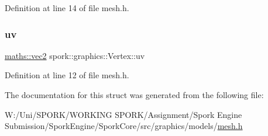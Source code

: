 Definition at line 14 of file mesh.\+h.

\mbox{\label{structspork_1_1graphics_1_1_vertex_a6819c06c407580090fbef90a86241d30}} 
\subsubsection{\texorpdfstring{uv}{uv}}
{\footnotesize\ttfamily \hyperlink{structspork_1_1maths_1_1vec2}{maths\+::vec2} spork\+::graphics\+::\+Vertex\+::uv}



Definition at line 12 of file mesh.\+h.



The documentation for this struct was generated from the following file\+:\begin{DoxyCompactItemize}
\item 
W\+:/\+Uni/\+S\+P\+O\+R\+K/\+W\+O\+R\+K\+I\+N\+G S\+P\+O\+R\+K/\+Assignment/\+Spork Engine Submission/\+Spork\+Engine/\+Spork\+Core/src/graphics/models/\hyperlink{mesh_8h}{mesh.\+h}\end{DoxyCompactItemize}
